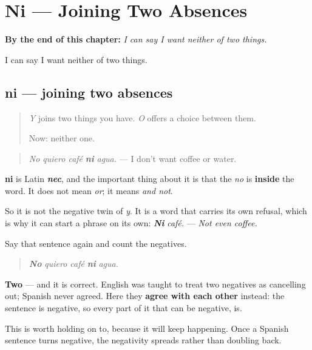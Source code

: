 
\chapter{Ni --- Joining Two Absences}
\label{ch:ni}

\begin{chapteropening}
\textbf{By the end of this chapter:} \emph{I can say I want neither of two things.}

I can say I want neither of two things.
\end{chapteropening}

\section[ni]{ni — joining two absences}

\label{lesson:ES-C61-ni}



\begin{quote}
\emph{Y} joins two things you have. \emph{O} offers a choice between them.

Now: neither one.
\end{quote}

\begin{cousinweb}
\begin{quote}
\emph{No quiero café} \emph{\textbf{ni}} \emph{agua.} — I don't want coffee or water.
\end{quote}

\textbf{ni} is Latin \emph{\textbf{nec}}, and the important thing about it is that the \emph{no} is \textbf{inside} the word. It does not mean \emph{or}; it means \emph{and not}.

So it is not the negative twin of \emph{y}. It is a word that carries its own refusal, which is why it can start a phrase on its own: \emph{\textbf{Ni}} \emph{café.} — \emph{Not even coffee.}
\end{cousinweb}

\begin{culture}
Say that sentence again and count the negatives.

\begin{quote}
\emph{\textbf{No}} \emph{quiero café} \emph{\textbf{ni}} \emph{agua.}
\end{quote}

\textbf{Two} — and it is correct. English was taught to treat two negatives as cancelling out; Spanish never agreed. Here they \textbf{agree with each other} instead: the sentence is negative, so every part of it that can be negative, is.

This is worth holding on to, because it will keep happening. Once a Spanish sentence turns negative, the negativity spreads rather than doubling back.
\end{culture}

